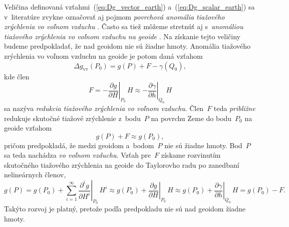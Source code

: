 \documentclass[a4paper, 12pt]{book}
\begin{document}
Veličina definovaná vzťahmi~(\ref{eq:Dg_vector_earth}) 
a~(\ref{eq:Dg_scalar_earth}) sa v~literatúre zvykne označovať aj pojmom 
\emph{povrchová anomália tiažového zrýchlenia vo voľnom vzduchu} 
\parencite{SansoGeoidDetermination}.  Často sa tiež môžeme stretnúť aj 
s~\emph{anomáliou tiažového zrýchlenia vo voľnom vzduchu na geoide} 
\parencite{MoritzPhysicalGeodesy}.  Na získanie tejto veličiny budeme 
predpokladať, že nad geoidom nie sú žiadne hmoty.  Anomália tiažového 
zrýchlenia vo voľnom vzduchu na geoide je potom daná vzťahom
%
\begin{equation}
\Delta g_\mathrm{vv}(P_0) = g(P) + F - \gamma(Q_0){,}
\end{equation}
%
kde člen
%
\begin{equation}
F = -\left.\frac{\partial g}{\partial H}\right|_{P_0} \, H \approx 
-\left.\frac{\partial \gamma}{\partial h}\right|_{Q_0} \, H
\end{equation}
%
sa nazýva \emph{redukcia tiažového zrýchlenia vo voľnom vzduchu}.  Člen~$F$ 
teda \emph{približne} redukuje skutočné tiažové zrýchlenie z~bodu~$P$ na 
povrchu Zeme do bodu~$P_0$ na geoide vzťahom
%
\begin{equation}
g(P) + F \approx g(P_0){,}
\end{equation}
%
pričom predpokladá, že medzi geoidom a~bodom~$P$ nie sú žiadne hmoty.  Bod~$P$ 
sa teda nachádza \emph{vo voľnom vzduchu}.
Vzťah pre~$F$ získame rozvinutím skutočného tiažového zrýchlenia na geoide do 
Taylorovho radu po zanedbaní nelineárnych členov,
%
\begin{equation}
g(P) = g(P_0) + \sum_{i = 1}^{\infty} \left.\frac{\partial^i g}{\partial 
H^i}\right|_{P_0} \, H^i \approx g(P_0) + \left.\frac{\partial g}{\partial 
H}\right|_{P_0} \, H \approx g(P_0) + \left.\frac{\partial \gamma}{\partial 
h}\right|_{Q_0} \, H = g(P_0) - F{.}
\end{equation}
%
Takýto rozvoj je platný, pretože podľa predpokladu nie sú nad geoidom žiadne 
hmoty.
\end{document}
